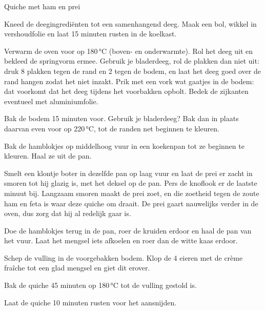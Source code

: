 \begin{recipe}{Quiche met ham en prei}
\begin{steps}
  \item Kneed de deegingrediënten tot een samenhangend deeg. Maak een bol, wikkel
        in vershoudfolie en laat 15 minuten rusten in de koelkast.
  \item Verwarm de oven voor op 180\,°C (boven- en onderwarmte). Rol het deeg uit en bekleed de springvorm
        ermee. Gebruik je bladerdeeg, rol de plakken dan niet uit: druk 8
        plakken tegen de rand en 2 tegen de bodem, en laat het deeg goed over
        de rand hangen zodat het niet inzakt. Prik met een vork wat gaatjes
        in de bodem: dat voorkomt dat het deeg tijdens het voorbakken opbolt.
        Bedek de zijkanten eventueel met aluminiumfolie.
  \item Bak de bodem 15 minuten voor. Gebruik je bladerdeeg? Bak dan in
        plaats daarvan even voor op 220\,°C, tot de randen net beginnen te
        kleuren.
  \item Bak de hamblokjes op middelhoog vuur in een koekenpan tot ze beginnen te
        kleuren. Haal ze uit de pan.
  \item Smelt een klontje boter in dezelfde pan op laag vuur en laat de prei
        er zacht in smoren tot hij glazig is, met het deksel op de pan. Pers de
        knoflook er de laatste minuut bij. Langzaam smoren maakt de prei zoet,
        en die zoetheid tegen de zoute ham en feta is waar deze quiche om
        draait. De prei gaart nauwelijks verder in de oven, dus zorg dat hij
        al redelijk gaar is.
  \item Doe de hamblokjes terug in de pan, roer de kruiden erdoor en haal de
        pan van het vuur. Laat het mengsel iets afkoelen en roer dan de witte
        kaas erdoor.
  \item Schep de vulling in de voorgebakken bodem. Klop de 4 eieren met de crème
        fraîche tot een glad mengsel en giet dit erover.
  \item Bak de quiche 45 minuten op 180\,°C tot de vulling gestold is.
  \item Laat de quiche 10 minuten rusten voor het aansnijden.
\end{steps}

\end{recipe}

